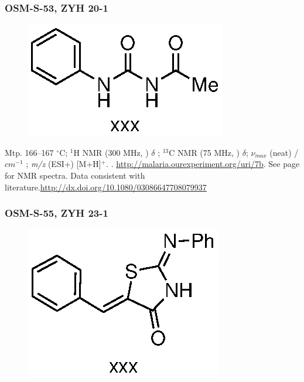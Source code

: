 \documentclass[12pt, a4paper,titlepage]{article}
\begin{document}
\subsubsection*{OSM-S-53, ZYH 20-1}
\label{exp:ZYH20}
	\begin{figure}[H]
	\begin{center}
	\includegraphics{exp/ZYH20.eps}
	\end{center}
	\vspace{-25pt}	
	\end{figure}

Mtp. 166--167 $^\circ$C;
$^1$H NMR (300 MHz, ) $\delta$ ; 
$^{13}$C NMR (75 MHz, ) $\delta$;
 $\nu_{max}$ (neat) /$cm^{-1}$ ;
\emph{m/z} (ESI+) [M+H]$^+$.
.
\url{http://malaria.ourexperiment.org/uri/7b}.
See page \pageref{spec:ZYH20} for NMR spectra. Data consistent with literature.\url{http://dx.doi.org/10.1080/03086647708079937}

\subsubsection*{OSM-S-55, ZYH 23-1}
\label{exp:ZYH23}
	\begin{figure}[H]
	\begin{center}
	\includegraphics{exp/ZYH23.eps}
	\end{center}
	\vspace{-25pt}	
	\end{figure}
\end{document}
